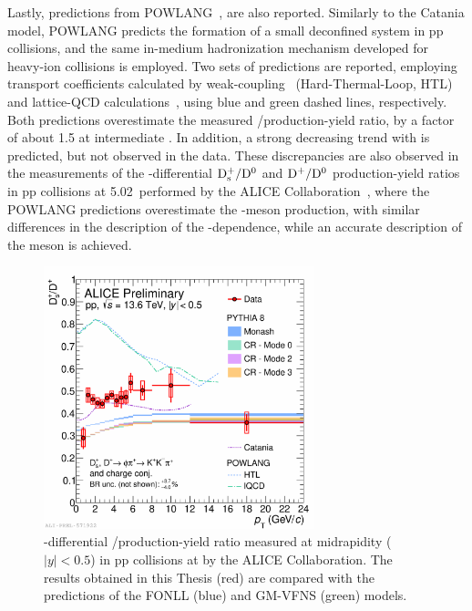 Lastly, predictions from POWLANG~\cite{Beraudo:2023nlq}, are also reported. Similarly to the Catania model, POWLANG predicts the formation of a small deconfined system in pp collisions, and the same in-medium hadronization mechanism developed for heavy-ion collisions is employed. Two sets of predictions are reported, employing transport coefficients calculated by weak-coupling~\cite{Braaten:1989mz} (Hard-Thermal-Loop, HTL) and lattice-QCD calculations~\cite{Altenkort:2023oms}, using blue and green dashed lines, respectively. Both predictions overestimate the measured \ds/\dpl production-yield ratio, by a factor of about 1.5 at intermediate \pt. In addition, a strong decreasing trend with \pt is predicted, but not observed in the data. These discrepancies are also observed in the measurements of the \pt-differential $\mathrm{D_s^+}/\mathrm{D^0}$ and $\mathrm{D^+}/\mathrm{D^0}$ production-yield ratios in pp collisions at 5.02~\tev performed by the ALICE Collaboration~\cite{Beraudo:2023nlq}, where the POWLANG predictions overestimate the \ds-meson production, with similar differences in the description of the \pt-dependence, while an accurate description of the \dpl meson is achieved.




\begin{figure}
    \centering
    \includegraphics[width=0.7\textwidth]{Figures/Chapter 7/dsoverdpluscomparisonmodels_0.pdf}
    \caption{\pt-differential \ds/\dpl production-yield ratio measured at midrapidity ($\lvert y\rvert<0.5$) in pp collisions at \thirteen by the ALICE Collaboration. The results obtained in this Thesis (red) are compared with the predictions of the FONLL (blue) and GM-VFNS (green) models.}
    \label{fig:dsdplvsmodels}
\end{figure}



